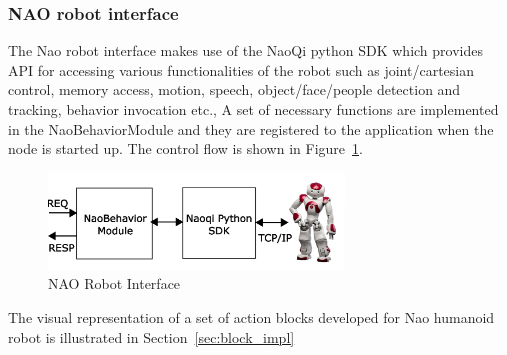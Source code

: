 \subsubsection{NAO robot interface}
\label{sssec:nao_interface}
The Nao robot interface makes use of the NaoQi python SDK which provides API for accessing various functionalities of the robot such as joint/cartesian control, memory access, motion, speech, object/face/people detection and tracking, behavior invocation etc., A set of necessary functions are implemented in the NaoBehaviorModule and they are registered to the application when the node is started up. The control flow is shown in Figure~\ref{fig:nao_interface}.
\begin{figure}[H]
\centering
\includegraphics[width=0.7\textwidth]{assets/NaoBehaviorModule.eps}
\caption[NAO Robot Interface]{NAO Robot Interface}
\label{fig:nao_interface}
\end{figure}
The visual representation of a set of action blocks developed for Nao humanoid robot is illustrated in Section~\ref{sec:block_impl}
